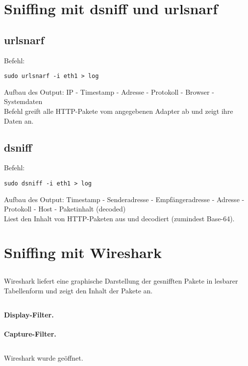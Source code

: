 \documentclass[twoside]{article}
\begin{document}
\section{Sniffing mit dsniff und urlsnarf}
\subsection{urlsnarf}
Befehl:
\begin{lstlisting}
sudo urlsnarf -i eth1 > log
\end{lstlisting}
Aufbau des Output: IP - Timestamp - Adresse - Protokoll - Browser - Systemdaten\\
Befehl greift alle HTTP-Pakete vom angegebenen Adapter ab und zeigt ihre Daten an.
\subsection{dsniff}
Befehl:
\begin{lstlisting}
sudo dsniff -i eth1 > log
\end{lstlisting}
Aufbau des Output: Timestamp - Senderadresse - Empfängeradresse - Adresse - Protokoll - Host - Paketinhalt (decoded)\\
Liest den Inhalt von HTTP-Paketen aus und decodiert (zumindest Base-64).
\section{Sniffing mit Wireshark}
\subsection{}
Wireshark liefert eine graphische Darstellung der gesnifften Pakete in lesbarer Tabellenform und zeigt den Inhalt der Pakete an.
\subsection{}
\paragraph{Display-Filter.}

\paragraph{Capture-Filter.}

\subsection{}
Wireshark wurde geöffnet.
\end{document}
